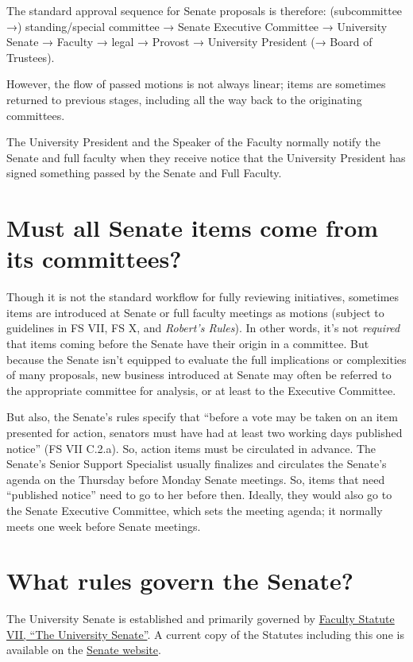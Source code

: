 \documentclass[12pt]{article}
\begin{document}
The standard approval sequence for Senate proposals is therefore:
(subcommittee →) standing/special committee → Senate Executive Committee
→ University Senate → Faculty → legal → Provost → University President
(→ Board of Trustees).

However, the flow of passed motions is not always linear; items are
sometimes returned to previous stages, including all the way back to the
originating committees.

The University President and the Speaker of the Faculty normally notify
the Senate and full faculty when they receive notice that the University
President has signed something passed by the Senate and Full Faculty.

\section{Must all Senate items come from its
committees?}\label{must-all-senate-items-come-from-its-committees}

Though it is not the standard workflow for fully reviewing initiatives,
sometimes items are introduced at Senate or full faculty meetings as
motions (subject to guidelines in FS VII, FS X, and \emph{Robert's
Rules}). In other words, it's not \emph{required} that items coming
before the Senate have their origin in a committee. But because the
Senate isn't equipped to evaluate the full implications or complexities
of many proposals, new business introduced at Senate may often be
referred to the appropriate committee for analysis, or at least to the
Executive Committee.

But also, the Senate's rules specify that ``before a vote may be taken
on an item presented for action, senators must have had at least two
working days published notice'' (FS VII C.2.a). So, action items must be
circulated in advance. The Senate's Senior Support Specialist usually
finalizes and circulates the Senate's agenda on the Thursday before
Monday Senate meetings. So, items that need ``published notice'' need to
go to her before then. Ideally, they would also go to the Senate
Executive Committee, which sets the meeting agenda; it normally meets
one week before Senate meetings.

\section{What rules govern the
Senate?}\label{what-rules-govern-the-senate}

The University Senate is established and primarily governed by
\href{https://www.hofstra.edu/sites/default/files/2024-04/facultystatutes.pdf}{Faculty
Statute VII, ``The University Senate''}. A current copy of the Statutes
including this one is available on the
\href{https://www.hofstra.edu/senate/}{Senate website}.
\end{document}
